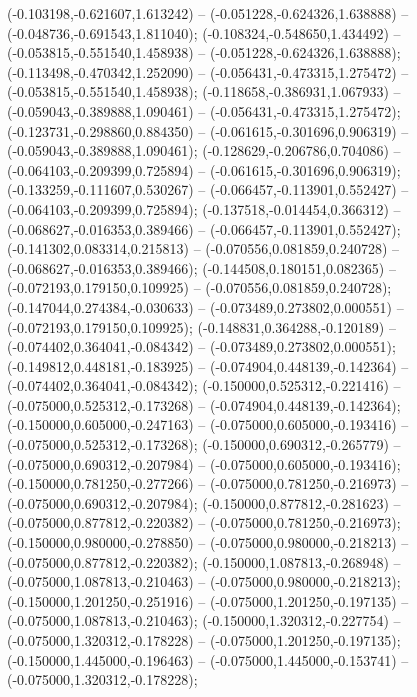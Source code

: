  (-0.103198,-0.621607,1.613242) -- (-0.051228,-0.624326,1.638888) -- (-0.048736,-0.691543,1.811040);
 (-0.108324,-0.548650,1.434492) -- (-0.053815,-0.551540,1.458938) -- (-0.051228,-0.624326,1.638888);
 (-0.113498,-0.470342,1.252090) -- (-0.056431,-0.473315,1.275472) -- (-0.053815,-0.551540,1.458938);
 (-0.118658,-0.386931,1.067933) -- (-0.059043,-0.389888,1.090461) -- (-0.056431,-0.473315,1.275472);
 (-0.123731,-0.298860,0.884350) -- (-0.061615,-0.301696,0.906319) -- (-0.059043,-0.389888,1.090461);
 (-0.128629,-0.206786,0.704086) -- (-0.064103,-0.209399,0.725894) -- (-0.061615,-0.301696,0.906319);
 (-0.133259,-0.111607,0.530267) -- (-0.066457,-0.113901,0.552427) -- (-0.064103,-0.209399,0.725894);
 (-0.137518,-0.014454,0.366312) -- (-0.068627,-0.016353,0.389466) -- (-0.066457,-0.113901,0.552427);
 (-0.141302,0.083314,0.215813) -- (-0.070556,0.081859,0.240728) -- (-0.068627,-0.016353,0.389466);
 (-0.144508,0.180151,0.082365) -- (-0.072193,0.179150,0.109925) -- (-0.070556,0.081859,0.240728);
 (-0.147044,0.274384,-0.030633) -- (-0.073489,0.273802,0.000551) -- (-0.072193,0.179150,0.109925);
 (-0.148831,0.364288,-0.120189) -- (-0.074402,0.364041,-0.084342) -- (-0.073489,0.273802,0.000551);
 (-0.149812,0.448181,-0.183925) -- (-0.074904,0.448139,-0.142364) -- (-0.074402,0.364041,-0.084342);
 (-0.150000,0.525312,-0.221416) -- (-0.075000,0.525312,-0.173268) -- (-0.074904,0.448139,-0.142364);
 (-0.150000,0.605000,-0.247163) -- (-0.075000,0.605000,-0.193416) -- (-0.075000,0.525312,-0.173268);
 (-0.150000,0.690312,-0.265779) -- (-0.075000,0.690312,-0.207984) -- (-0.075000,0.605000,-0.193416);
 (-0.150000,0.781250,-0.277266) -- (-0.075000,0.781250,-0.216973) -- (-0.075000,0.690312,-0.207984);
 (-0.150000,0.877812,-0.281623) -- (-0.075000,0.877812,-0.220382) -- (-0.075000,0.781250,-0.216973);
 (-0.150000,0.980000,-0.278850) -- (-0.075000,0.980000,-0.218213) -- (-0.075000,0.877812,-0.220382);
 (-0.150000,1.087813,-0.268948) -- (-0.075000,1.087813,-0.210463) -- (-0.075000,0.980000,-0.218213);
 (-0.150000,1.201250,-0.251916) -- (-0.075000,1.201250,-0.197135) -- (-0.075000,1.087813,-0.210463);
 (-0.150000,1.320312,-0.227754) -- (-0.075000,1.320312,-0.178228) -- (-0.075000,1.201250,-0.197135);
 (-0.150000,1.445000,-0.196463) -- (-0.075000,1.445000,-0.153741) -- (-0.075000,1.320312,-0.178228);
